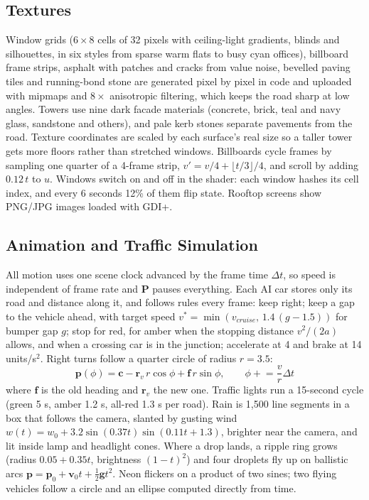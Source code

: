 \documentclass[12pt, a4paper]{report}
\begin{document}
\subsection{Textures}

\begin{justify}
  {\fontsize{12}{13.8}\selectfont
    Window grids ($6\times8$ cells of 32 pixels with ceiling-light gradients, blinds and silhouettes, in six styles from sparse warm flats to busy cyan offices), billboard frame strips, asphalt with patches and cracks from value noise, bevelled paving tiles and running-bond stone are generated pixel by pixel in code and uploaded with mipmaps and $8\times$ anisotropic filtering, which keeps the road sharp at low angles. Towers use nine dark facade materials (concrete, brick, teal and navy glass, sandstone and others), and pale kerb stones separate pavements from the road. Texture coordinates are scaled by each surface's real size so a taller tower gets more floors rather than stretched windows. Billboards cycle frames by sampling one quarter of a 4-frame strip, $v' = v/4 + \lfloor t/3\rfloor/4$, and scroll by adding $0.12\,t$ to $u$. Windows switch on and off in the shader: each window hashes its cell index, and every 6 seconds 12\% of them flip state. Rooftop screens show PNG/JPG images loaded with GDI+.
  }
\end{justify}

\subsection{Animation and Traffic Simulation}

\begin{justify}
  {\fontsize{12}{13.8}\selectfont
    All motion uses one scene clock advanced by the frame time $\Delta t$, so speed is independent of frame rate and \textbf{P} pauses everything. Each AI car stores only its road and distance along it, and follows rules every frame: keep right; keep a gap to the vehicle ahead, with target speed $v^{*}=\min(v_{cruise},\,1.4\,(g-1.5))$ for bumper gap $g$; stop for red, for amber when the stopping distance $v^2/(2a)$ allows, and when a crossing car is in the junction; accelerate at 4 and brake at 14 units/s$^2$. Right turns follow a quarter circle of radius $r=3.5$:
    \begin{equation}
      \mathbf{p}(\phi)=\mathbf{c}-\mathbf{r}_v\,r\cos\phi+\mathbf{f}\,r\sin\phi,\qquad \phi \mathrel{+}= \frac{v}{r}\Delta t
    \end{equation}
    where $\mathbf{f}$ is the old heading and $\mathbf{r}_v$ the new one. Traffic lights run a 15-second cycle (green 5 s, amber 1.2 s, all-red 1.3 s per road). Rain is 1,500 line segments in a box that follows the camera, slanted by gusting wind $w(t)=w_0+3.2\sin(0.37t)\sin(0.11t+1.3)$, brighter near the camera, and lit inside lamp and headlight cones. Where a drop lands, a ripple ring grows (radius $0.05+0.35t$, brightness $(1-t)^2$) and four droplets fly up on ballistic arcs $\mathbf{p}=\mathbf{p}_0+\mathbf{v}_0t+\tfrac12\mathbf{g}t^2$. Neon flickers on a product of two sines; two flying vehicles follow a circle and an ellipse computed directly from time.
  }
\end{justify}
\end{document}
